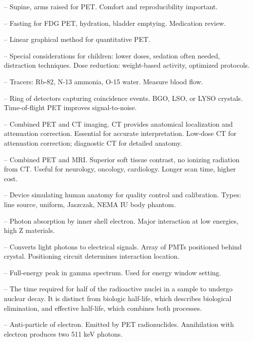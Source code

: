 -- Supine, arms raised for PET. Comfort and reproducibility important.

-- Fasting for FDG PET, hydration, bladder emptying. Medication review.

-- Linear graphical method for quantitative PET.

-- Special considerations for children: lower doses, sedation often needed, distraction techniques. Dose reduction: weight-based activity, optimized protocols.

-- Tracers: Rb-82, N-13 ammonia, O-15 water. Measure blood flow.

-- Ring of detectors capturing coincidence events. BGO, LSO, or LYSO crystals. Time-of-flight PET improves signal-to-noise.

-- Combined PET and CT imaging. CT provides anatomical localization and attenuation correction. Essential for accurate interpretation. Low-dose CT for attenuation correction; diagnostic CT for detailed anatomy.

-- Combined PET and MRI. Superior soft tissue contrast, no ionizing radiation from CT. Useful for neurology, oncology, cardiology. Longer scan time, higher cost.

-- Device simulating human anatomy for quality control and calibration. Types: line source, uniform, Jaszczak, NEMA IU body phantom.

-- Photon absorption by inner shell electron. Major interaction at low energies, high Z materials.

-- Converts light photons to electrical signals. Array of PMTs positioned behind crystal. Positioning circuit determines interaction location.

-- Full-energy peak in gamma spectrum. Used for energy window setting.

-- The time required for half of the radioactive nuclei in a sample to undergo nuclear decay. It is distinct from biologic half-life, which describes biological elimination, and effective half-life, which combines both processes.

-- Anti-particle of electron. Emitted by PET radionuclides. Annihilation with electron produces two 511 keV photons.

